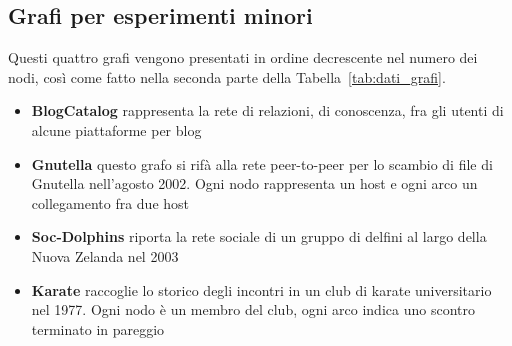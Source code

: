 \subsection*{Grafi per esperimenti minori}
Questi quattro grafi vengono presentati in ordine decrescente nel numero dei nodi, così come fatto nella seconda parte della Tabella~\ref{tab:dati_grafi}.\\
\begin{itemize}
	\item \textbf{BlogCatalog}\cite{BlogCatalog} rappresenta la rete di relazioni, di conoscenza, fra gli utenti di alcune piattaforme per blog
	\item \textbf{Gnutella}\cite{Gnutella_1}\cite{Gnutella_2} questo grafo si rifà alla rete peer-to-peer per lo scambio di file di Gnutella nell'agosto 2002. Ogni nodo rappresenta un host e ogni arco un collegamento fra due host
	\item \textbf{Soc-Dolphins}\cite{Dolphins_1}\cite{Dolphins_2} riporta la rete sociale di un gruppo di delfini al largo della Nuova Zelanda nel 2003
	\item \textbf{Karate}\cite{Karate} raccoglie lo storico degli incontri in un club di karate universitario nel 1977. Ogni nodo è un membro del club, ogni arco indica uno scontro terminato in pareggio
\end{itemize}
%

